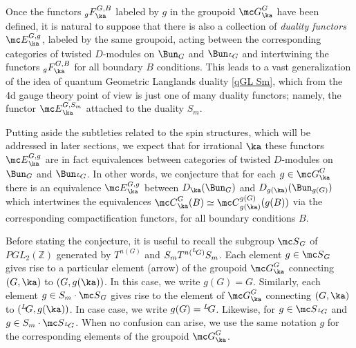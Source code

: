 \documentclass[11pt,reqno]{amsart}
\theoremstyle{plain}
\numberwithin{equation}{section}
\newcommand{\Z}{\mathbb{Z}}
\def\neg{\negthinspace}
\def\LG{{}^L\neg G}
\theoremstyle{definition}
\begin{document}
Once the functors $_g F^{G,B}_\ka$ labeled by $g$ in the groupoid
${\mc G}^G_\ka$ have been defined, it is natural to suppose that there
is also a collection of {\em duality functors} ${\mc E}^{G,g}_\ka$,
labeled by the same groupoid, acting between the corresponding
categories of twisted $D$-modules on $\Bun_G$ and $\Bun_{\LG}$ and
intertwining the functors $_g F^{G,B}_\ka$ for all boundary $B$
conditions. This leads to a vast generalization of the idea of quantum
Geometric Langlands duality \eqref{qGL Sm}, which from the 4d gauge
theory point of view is just one of many duality functors; namely, the
functor ${\mc E}^{G,S_m}_\ka$ attached to the duality $S_m$.

Putting aside the subtleties related to the spin structures, which
will be addressed in later sections, we expect that for irrational $\ka$
these functors ${\mc E}^{G,g}_\ka$ are in fact equivalences between
categories of twisted $D$-modules on $\Bun_G$ and $\Bun_{\LG}$. In
other words, we conjecture that for each $g \in {\mc G}^G_\ka$ there
is an equivalence ${\mc E}^{G,g}_\ka$ between $D_\ka(\Bun_G)$ and
$D_{g(\ka)}(\Bun_{g(G)})$ which intertwines the equivalences ${\mc
  C}^G_\ka(B) \simeq {\mc C}^{g(G)}_{g(\ka)}(g(B))$ via the
corresponding compactification functors, for all boundary conditions
$B$.

Before stating the conjecture, it is useful to recall the subgroup
${\mc S}_G$ of $PGL_2(\Z)$ generated by $T^{n(G)}$ and $S_m T^{n(\LG)}
S_m$. Each element $g \in {\mc S}_G$ gives rise to a particular
element (arrow) of the groupoid ${\mc G}^G_\ka$ connecting $(G,\ka)$
to $(G,g(\ka))$. In this case, we write $g(G)=G$. Similarly, each
element $g \in S_m \cdot {\mc S}_G$ gives rise to the element of ${\mc
  G}^G_\ka$ connecting $(G,\ka)$ to $(\LG,g(\ka))$. In case case, we
write $g(G)=\LG$. Likewise, for $g \in {\mc S}_{\LG}$ and $g \in S_m
\cdot {\mc S}_{\LG}$. When no confusion can arise, we use the same
notation $g$ for the corresponding elements of the groupoid ${\mc
  G}^G_\ka$.
\end{document}
